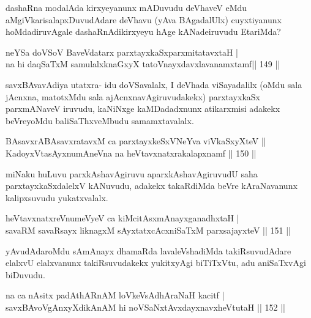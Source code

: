 \begin{artha}
dashaRna modalAda kirxyeyanunx mADuvudu deVhaveV eMdu aMgiVkarisalapxDuvudAdare deVhavu (yAva BAgadalUlx) cuyxtiyanunx hoMdadiruvAgale dashaRnAdikirxyeyu hAge kANadeiruvudu EtariMda?
\end{artha}


\begin{shl}
neYSa doVSoV BaveVdatarx parxtayxkaSxparxmitatavxtaH | \\
na hi daqSaTxM samulalxknaGxyX tatoV\s nayxdavxlavanamxtamf\hfill||  149 ||  
\end{shl}

\begin{artha}
savxBAvavAdiya utatxra- idu doVSavalalx, I deVhada viSayadalilx (oMdu sala jAcnxna, matotxMdu sala ajAcnxnavAgiruvudakekx) parxtayxkaSx parxmANaveV iruvudu, kaNiNxge kaMDadadxnunx atikarxmisi adakekx beVreyoMdu baliSaThxveMbudu samamxtavalalx.
\end{artha}

\begin{shl}
BAsavxrABAsavxratavxM ca parxtayxkeSxVNeYva viVkaSxyXteV ||  \\
KadoyxVtasAyxnumAneVna na heVtavxnatxrakalapxnamf \hfill||  150 ||  
\end{shl}

\begin{artha}
miNaku huLuvu parxkAshavAgiruvu aparxkAshavAgiruvudU saha parxtayxkaSxdalelxV kANuvudu, adakekx takaRdiMda beVre kAraNavanunx kalipxsuvudu yukatxvalalx.
\end{artha}

\begin{shl}
heVtavxnatxreV\s numeVyeV ca kiMcitAsxmAnayxganadhxtaH | \\
savaRM savaRsayx liknagxM sAyxtatxcAcxniSaTxM parxsajayxteV \hfill||  151 ||  
\end{shl}

\begin{artha}
yAvudAdaroMdu sAmAnayx dhamaRda lavaleVshadiMda takiRsuvudAdare elalxvU elalxvanunx takiRsuvudakekx yukitxyAgi biTiTxVtu, adu aniSaTxvAgi biDuvudu.
\end{artha}

\begin{shl}
na ca nAsitx padAthARnAM loVkeV\s sAdhAraNaH kacitf | \\
savxBAvoV\s gAnxyXdikAnAM hi noVSaNxtAvxdayxnavxheVtutaH \hfill||  152 ||  
\end{shl}

